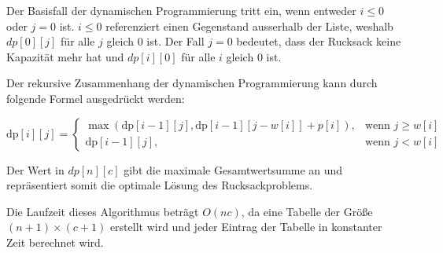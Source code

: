 Der Basisfall der dynamischen Programmierung tritt ein, wenn 
entweder $i \le 0$ oder $j = 0$ ist. $i \le 0$ referenziert einen 
Gegenstand ausserhalb der Liste, weshalb $dp[0][j]$ für alle $j$ gleich $0$ ist. 
Der Fall $j = 0$ bedeutet, 
dass der Rucksack keine Kapazität mehr hat und $dp[i][0]$ 
für alle $i$ gleich $0$ ist.

Der rekursive Zusammenhang der dynamischen Programmierung 
kann durch folgende Formel ausgedrückt werden:

\begin{equation}
    \text{dp}[i][j] = \begin{cases}
        \max(\text{dp}[i-1][j], \text{dp}[i-1][j-w[i]] + p[i]), & \text{wenn } j \geq w[i] \\
        \text{dp}[i-1][j], & \text{wenn } j < w[i]
    \end{cases}
\end{equation}


Der Wert in $dp[n][c]$ gibt die maximale Gesamtwertsumme an und 
repräsentiert somit die optimale Lösung des Rucksackproblems.

Die Laufzeit dieses Algorithmus beträgt $O(nc)$, da 
eine Tabelle der Größe $(n+1) × (c+1)$ erstellt wird und 
jeder Eintrag der Tabelle in konstanter Zeit berechnet wird.\ \cite[vgl.]{Martello1987}